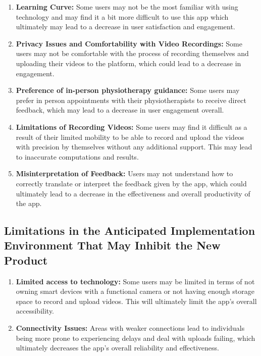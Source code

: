 \documentclass[12pt]{article}
\begin{document}
\begin{enumerate}
  \item \textbf{Learning Curve:} Some users may not be the most familiar with using technology and may find it a bit more 
  difficult to use this app which ultimately may lead to a decrease in user satisfaction and engagement.
  \item \textbf{Privacy Issues and Comfortability with Video Recordings:} Some users may not be comfortable with the process 
  of recording themselves and uploading their videos to the platform, which could lead to a decrease in engagement.
  \item \textbf{Preference of in-person physiotherapy guidance:} Some users may prefer in person appointments with their 
  physiotherapists to receive direct feedback, which may lead to a decrease in user engagement overall. 
  \item \textbf{Limitations of Recording Videos:} Some users may find it difficult as a result of their limited mobility 
  to be able to record and upload the videos with precision by themselves without any additional support. This may lead to 
  inaccurate computations and results.
  \item \textbf{Misinterpretation of Feedback:} Users may not understand how to correctly translate or interpret the feedback 
  given by the app, which could ultimately lead to a decrease in the effectiveness and overall productivity of the app.
\end{enumerate}

\subsection{Limitations in the Anticipated Implementation Environment That May
Inhibit the New Product}

\begin{enumerate}
  \item \textbf{Limited access to technology:} Some users may be limited in terms of not owning smart devices with a 
  functional camera or not having enough storage space to record and upload videos. This will ultimately limit the app's overall 
  accessibility.
  \item \textbf{Connectivity Issues:} Areas with weaker connections lead to individuals being more prone to experiencing 
  delays and deal with uploads failing, which ultimately decreases the app’s overall reliability and effectiveness.
\end{enumerate}
\end{document}
